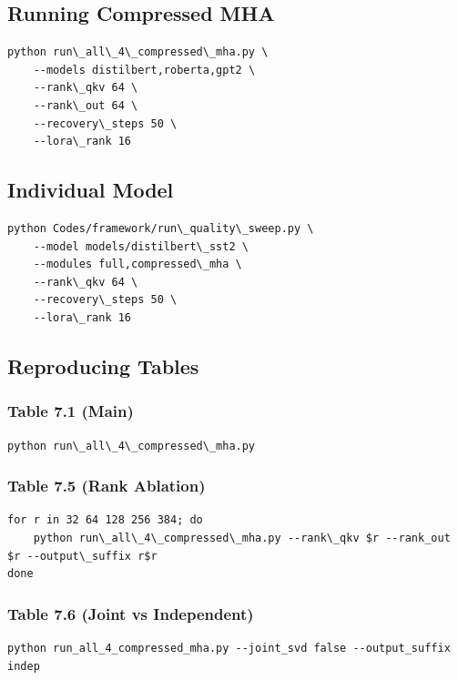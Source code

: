 \subsection{Running Compressed MHA}

\begin{lstlisting}
python run\_all\_4\_compressed\_mha.py \
    --models distilbert,roberta,gpt2 \
    --rank\_qkv 64 \
    --rank\_out 64 \
    --recovery\_steps 50 \
    --lora\_rank 16
\end{lstlisting}

\subsection{Individual Model}

\begin{lstlisting}
python Codes/framework/run\_quality\_sweep.py \
    --model models/distilbert\_sst2 \
    --modules full,compressed\_mha \
    --rank\_qkv 64 \
    --recovery\_steps 50 \
    --lora\_rank 16
\end{lstlisting}

\subsection{Reproducing Tables}

\subsubsection{Table 7.1 (Main)}
\begin{lstlisting}
python run\_all\_4\_compressed\_mha.py
\end{lstlisting}

\subsubsection{Table 7.5 (Rank Ablation)}
\begin{lstlisting}
for r in 32 64 128 256 384; do
    python run\_all\_4\_compressed\_mha.py --rank\_qkv $r --rank_out $r --output\_suffix r$r
done
\end{lstlisting}

\subsubsection{Table 7.6 (Joint vs Independent)}
\begin{lstlisting}
python run_all_4_compressed_mha.py --joint_svd false --output_suffix indep
\end{lstlisting}

